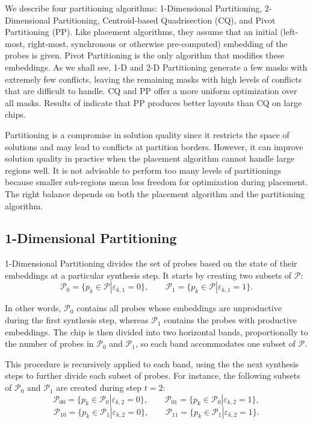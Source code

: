 \documentclass{w-edbk}
\newcommand{\eps}{\varepsilon}
\begin{document}
We describe four partitioning algorithms: 1-Dimensional Partitioning,
2-Dimen\-sional Partitioning, Centroid-based Quadrisection (CQ), and
Pivot Partitioning (PP). Like placement algorithms, they assume that
an initial (left-most, right-most, synchronous or otherwise
pre-computed) embedding of the probes is given. Pivot Partitioning is
the only algorithm that modifies these embeddings.  As we shall see,
1-D and 2-D Partitioning generate a few masks with extremely few
conflicts, leaving the remaining masks with high levels of conflicts
that are difficult to handle. CQ and PP offer a more uniform
optimization over all masks. Results of \citet{Carvalho2006} indicate
that PP produces better layouts than CQ on large chips.

Partitioning is a compromise in solution quality since it restricts
the space of solutions and may lead to conflicts at partition borders.
However, it can improve solution quality in practice when the
placement algorithm cannot handle large regions well. It is not
advisable to perform too many levels of partitionings because smaller
sub-regions mean less freedom for optimization during placement. The
right balance depends on both the placement algorithm and the
partitioning algorithm.


\subsection{1-Dimensional Partitioning}

1-Dimensional Partitioning divides the set of probes based on the state of
their embeddings at a particular synthesis step. It starts by creating two
subsets of $\mathcal{P}$:
\[
\mathcal{P}_0 = \{ p_k \in \mathcal{P} | \eps_{k,1} = 0 \},
\qquad
\mathcal{P}_1 = \{ p_k \in \mathcal{P} | \eps_{k,1} = 1 \}.
\]

In other words, $\mathcal{P}_0$ contains all probes whose embeddings are
unproductive during the first synthesis step, whereas $\mathcal{P}_1$
contains the probes with productive embeddings. The chip is then
divided into two horizontal bands, proportionally to the number of probes in
$\mathcal{P}_0$ and $\mathcal{P}_1$, so each band accommodates one subset
of $\mathcal{P}$.

This procedure is recursively applied to each band, using the the next
synthesis steps to further divide each subset of probes. For
instance, the following subsets of $\mathcal{P}_0$ and
$\mathcal{P}_1$ are created during step $t=2$:
\[
\mathcal{P}_{00} = \{ p_k \in \mathcal{P}_0 | \eps_{k,2} = 0 \},
\qquad
\mathcal{P}_{01} = \{ p_k \in \mathcal{P}_0 | \eps_{k,2} = 1 \},
\]
\[
\mathcal{P}_{10} = \{ p_k \in \mathcal{P}_1 | \eps_{k,2} = 0 \},
\qquad
\mathcal{P}_{11} = \{ p_k \in \mathcal{P}_1 | \eps_{k,2} = 1 \}.
\]
\end{document}
